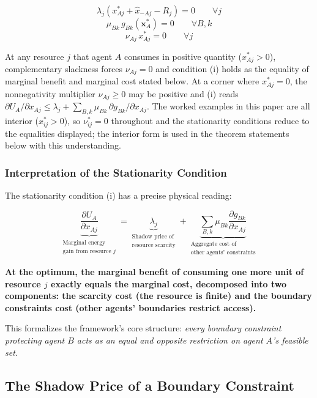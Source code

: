 \documentclass[11pt]{article}
\theoremstyle{plain}
\theoremstyle{definition}
\theoremstyle{remark}
\let\origsubsection\subsection
\renewcommand{\subsection}{\needspace{7\baselineskip}\origsubsection}
\let\origsubsubsection\subsubsection
\renewcommand{\subsubsection}{\needspace{4\baselineskip}\origsubsubsection}
\begin{document}
\[\lambda_j \left( x_{Aj}^* + \hat{x}_{-Aj} - R_j \right) = 0 \qquad \forall j\]
\[\mu_{Bk} \, g_{Bk}(\mathbf{x}_A^*) = 0 \qquad \forall B, k\]
\[\nu_{Aj} \, x_{Aj}^* = 0 \qquad \forall j\]

At any resource \(j\) that agent \(A\) consumes in positive quantity
(\(x_{Aj}^* > 0\)), complementary slackness forces \(\nu_{Aj} = 0\) and
condition (i) holds as the equality of marginal benefit and marginal
cost stated below. At a corner where \(x_{Aj}^* = 0\), the nonnegativity
multiplier \(\nu_{Aj} \geq 0\) may be positive and (i) reads
\(\partial U_A / \partial x_{Aj} \leq \lambda_j + \sum_{B,k} \mu_{Bk}\, \partial g_{Bk}/\partial x_{Aj}\).
The worked examples in this paper are all interior (\(x_{ij}^* > 0\)),
so \(\nu_{ij}^* = 0\) throughout and the stationarity conditions reduce
to the equalities displayed; the interior form is used in the theorem
statements below with this understanding.

\subsubsection{Interpretation of the Stationarity
Condition}\label{interpretation-of-the-stationarity-condition}

The stationarity condition (i) has a precise physical reading:

\[\underbrace{\frac{\partial U_A}{\partial x_{Aj}}}_{\substack{\text{Marginal energy} \\ \text{gain from resource } j}} = \underbrace{\lambda_j}_{\substack{\text{Shadow price of} \\ \text{resource scarcity}}} + \underbrace{\sum_{B,k} \mu_{Bk} \frac{\partial g_{Bk}}{\partial x_{Aj}}}_{\substack{\text{Aggregate cost of} \\ \text{other agents' constraints}}}\]

\textbf{At the optimum, the marginal benefit of consuming one more unit
of resource \(j\) exactly equals the marginal cost, decomposed into two
components: the scarcity cost (the resource is finite) and the boundary
constraints cost (other agents' boundaries restrict access).}

This formalizes the framework's core structure: \emph{every boundary
constraint protecting agent \(B\) acts as an equal and opposite
restriction on agent \(A\)'s feasible set.}

\subsection{The Shadow Price of a Boundary
Constraint}\label{the-shadow-price-of-a-boundary-constraint}
\end{document}
